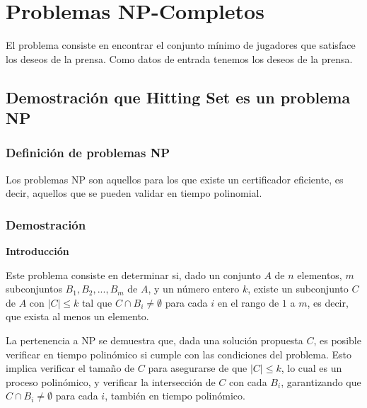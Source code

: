 \documentclass{estilo}
\begin{document}
\maketitle

\justifying{
}

% 
\newpage

\section{Problemas NP-Completos}

El problema consiste en encontrar el conjunto mínimo de jugadores que satisface los deseos de la prensa. Como datos de entrada tenemos los deseos de la prensa.


\subsection{Demostración que Hitting Set es un problema NP}

\subsubsection{Definición de problemas NP}
Los problemas NP son aquellos para los que existe un certificador eficiente, es decir, aquellos que se pueden validar en tiempo polinomial.

\subsubsection{Demostración}

\textbf{Introducción}

\hspace{0.5cm} Este problema consiste en determinar si, dado un conjunto \(A\) de \(n\) elementos, \(m\) subconjuntos \(B_1, B_2, ..., B_m\) de \(A\), y un número entero \(k\), existe un subconjunto \(C\) de \(A\) con \(|C| \leq k\) tal que \(C \cap B_i \neq \emptyset\) para cada \(i\) en el rango de \(1\) a \(m\), es decir, que exista al menos un elemento.

\hspace{0.5cm} La pertenencia a NP se demuestra que, dada una solución propuesta \(C\), es posible verificar en tiempo polinómico si cumple con las condiciones del problema. Esto implica verificar el tamaño de \(C\) para asegurarse de que \(|C| \leq k\), lo cual es un proceso polinómico, y verificar la intersección de \(C\) con cada \(B_i\), garantizando que \(C \cap B_i \neq \emptyset\) para cada \(i\), también en tiempo polinómico.
\end{document}
